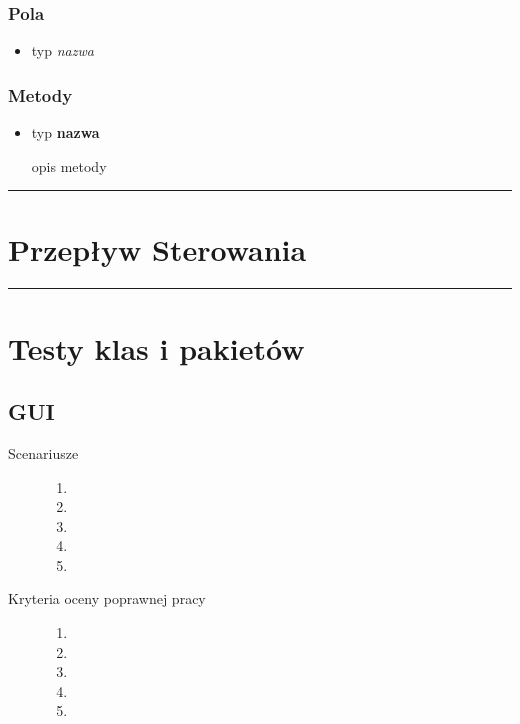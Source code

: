 \documentclass[a4paper,11pt]{article}
\newcommand{\linia}{\rule{\linewidth}{0.4mm}}
\begin{document}
\subsubsection{Pola}
\begin{itemize}
\item typ  \textit{nazwa}
\end{itemize}
\subsubsection{Metody}
\begin{itemize}
\item typ  \textbf{nazwa}

opis metody
\end{itemize}


\noindent\linia
\section{Przepływ Sterowania}




\noindent\linia
\section{Testy klas i pakietów}


\subsection{GUI}
\begin{description}

\item[Scenariusze] \hfill
\begin{enumerate}
\item
\item 
\item
\item
\item 
\end{enumerate}

\item[Kryteria oceny poprawnej pracy] \hfill
\begin{enumerate}
\item 
\item
\item
\item 
\item 
\end{enumerate}

\end{description}
\end{document}
